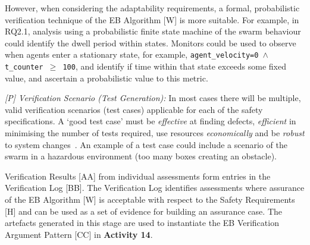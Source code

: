 \documentclass[runningheads]{llncs}
\begin{document}
%
However, when considering the adaptability requirements, a formal, probabilistic verification technique of the EB Algorithm [W] is more suitable. For example, in RQ2.1, analysis using a probabilistic finite state machine of the swarm behaviour could identify the dwell period within states. Monitors could be used to observe when agents enter a stationary state, for example, \texttt{agent\_velocity=0 $\land $  t\_counter  $\ge$ 100}, and identify if time within that state exceeds some fixed value, and ascertain a probabilistic value to this metric.

\emph{[P] Verification Scenario (Test Generation):} In most cases there will be multiple, valid verification scenarios (test cases) applicable for each of the safety specifications. 
A `good test case' must be \emph{effective} at finding defects, \emph{efficient} in minimising the number of tests required, use resources \emph{economically} and be \emph{robust} to system changes~\cite{Fewster1999}. 
An example of a test case could include a scenario of the swarm in a hazardous environment (too many boxes creating an obstacle).%


%
%

Verification Results [AA] from individual assessments form entries in the Verification Log [BB]. The Verification Log identifies assessments where assurance of the EB Algorithm [W] is acceptable with respect to the Safety Requirements [H] and can be used as a set of evidence for building an assurance case. %
The artefacts generated in this stage are used to instantiate the EB Verification Argument Pattern [CC] in \textbf{Activity 14}.
\end{document}
